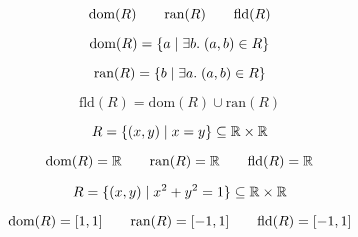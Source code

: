 
\begin{frame}{}
  \begin{center}
    \[
      \text{dom}(R) \qquad \text{ran}(R) \qquad \text{fld}(R)
    \]
  \end{center}
\end{frame}

\begin{frame}{}
  \begin{definition}
    \[
      \text{dom}(R) = \{a \mid \exists b.\; (a,b) \in R\}
    \]
  \end{definition}

  \pause
  \vspace{0.80cm}
  \begin{definition}[值域 (Range)]
    \[
      \text{ran}(R) = \{b \mid \exists a.\; (a,b) \in R\}
    \]
  \end{definition}

  \pause
  \vspace{0.80cm}
  \begin{definition}[域 (Field)]
    \[
      \text{fld}(R) = \text{dom}(R) \cup \text{ran}(R)
    \]
  \end{definition}
\end{frame}

\begin{frame}{}
  \[
    R = \{(x, y) \mid x = y\} \subseteq \mathbb{R} \times \mathbb{R}
  \]

  \pause
  \[
    \text{dom}(R) = \mathbb{R} \qquad \text{ran}(R) = \mathbb{R} \qquad \text{fld}(R) = \mathbb{R}
  \]
\end{frame}

\begin{frame}{}
  \[
    R = \{(x, y) \mid x^2 + y^2 = 1\} \subseteq \mathbb{R} \times \mathbb{R}
  \]

  \pause
  \[
    \text{dom}(R) = [1, 1] \qquad \text{ran}(R) = [-1, 1] \qquad \text{fld}(R) = [-1, 1]
  \]
\end{frame}


